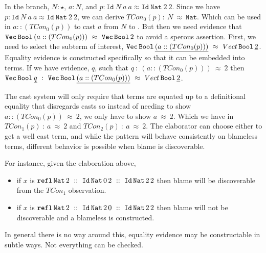 In the branch, $N:\star$, $a:N$, and $p:\mathtt{Id}\ N\ a\ a\approx\mathtt{Id}\ \mathtt{Nat}\ 2\ 2$.
Since we have $p:\mathtt{Id}\ N\ a\ a\approx\mathtt{Id}\ \mathtt{Nat}\ 2\ 2$, we can derive $TCon_0(p):\ N\ \approx\ \mathtt{Nat}$.
Which can be used in $a::(TCon_0(p))$ to cast $a$ from $N$ to \Nat{}.
But then we need evidence that $\mathtt{Vec}{}\, \mathtt{Bool}{}\, (a :: (TCon_0(p)))\ \approx\ \mathtt{Vec}{}\, \mathtt{Bool}{}\, 2$ to avoid a sperous assertion.
First, we need to select the subterm of interest, $\mathtt{Vec}{}\, \mathtt{Bool}{}\, \underline{(a :: (TCon_0(p)))}\ \approx\ Vect{}\, \mathtt{Bool}{}\, \underline{2}$.
Equality evidence is constructed specifically so that it can be embedded into terms.
If we have evidence, $q$, such that $q\ :\ (a ::(TCon_0(p)))\ \approx\ 2$ then $\Vect{}\, \Bool{}\, \underline{q}\ :\ \Vect{}\, \Bool{}\, \underline{(a :: (TCon_0(p)))}\ \approx\ Vect{}\, \Bool{}\, \underline{2}$.
 
The cast system will only require that terms are equated up to a definitional equality that disregards casts so instead of needing to show $a :: (TCon_0(p))\ \approx\ 2$, we only have to show $a\ \approx\ 2$.
Which we have in $TCon_1(p)\ :\ a\ \approx\ 2$ and $TCon_2(p)\ :\ a\ \approx\ 2$.
The elaborator can choose either to get a well cast term, and while the pattern will behave consistently on blameless terms, different behavior is possible when blame is discoverable.

For instance, given the elaboration above,
 
\begin{itemize}
  \item if $x$ is $\mathtt{refl}\,\Nat{}\,2\ ::\ \Id{}\,\Nat{}\,0\,2\ ::\ \Id{}\,\Nat{}\,2\,2$ then blame will be discoverable from the $TCon_1$ observation.
  \item if $x$ is $\mathtt{refl}\,\Nat{}\,2\ ::\ \Id{}\,\Nat{}\,2\,0\ ::\ \Id{}\,\Nat{}\,2\,2$ then blame will not be discoverable and a blameless \Vect{} is constructed.
\end{itemize}
In general there is no way around this, equality evidence may be constructable in subtle ways.
Not everything can be checked.

